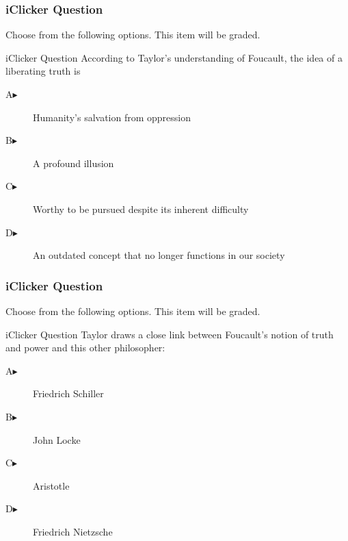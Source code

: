 \documentclass[xcolor=dvipsnames]{beamer}
\begin{document}
\begin{frame}
  \frametitle{iClicker Question}
Choose from the following options. This item will be graded.
\begin{block}{iClicker Question}
  According to Taylor's understanding of Foucault, the idea of a
  liberating truth is 
\end{block}
\begin{description}
\item[A\hspace{.2in}$\blacktriangleright$] Humanity's salvation from oppression
\item[B\hspace{.2in}$\blacktriangleright$] A profound illusion
\item[C\hspace{.2in}$\blacktriangleright$] Worthy to be pursued despite its inherent difficulty
\item[D\hspace{.2in}$\blacktriangleright$] An outdated concept that no longer functions in our society
\end{description}
\end{frame}

\begin{frame}
  \frametitle{iClicker Question}
Choose from the following options. This item will be graded.
\begin{block}{iClicker Question}
  Taylor draws a close link between Foucault's notion of truth and
  power and this other philosopher:
\end{block}
\begin{description}
\item[A\hspace{.2in}$\blacktriangleright$] Friedrich Schiller
\item[B\hspace{.2in}$\blacktriangleright$] John Locke
\item[C\hspace{.2in}$\blacktriangleright$] Aristotle
\item[D\hspace{.2in}$\blacktriangleright$] Friedrich Nietzsche
\end{description}
\end{frame}
\end{document}
